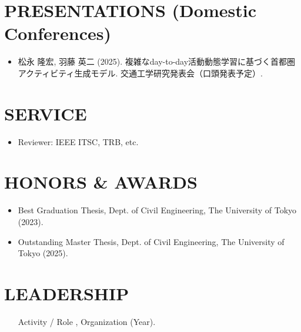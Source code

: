 \documentclass[uplatex,a4paper,10pt]{jsarticle}
\begin{document}
\section*{PRESENTATIONS (Domestic Conferences)}
\begin{itemize}
  \item 松永 隆宏, 羽藤 英二 (2025).
  複雑なday-to-day活動動態学習に基づく首都圏アクティビティ生成モデル.
  交通工学研究発表会（口頭発表予定）.
\end{itemize}

\section*{SERVICE}
\begin{itemize}
  \item Reviewer: IEEE ITSC, TRB, etc.
\end{itemize}

\section*{HONORS \& AWARDS}
\begin{itemize}
  \item Best Graduation Thesis, Dept. of Civil Engineering, The University of Tokyo (2023).
  \item Outstanding Master Thesis, Dept. of Civil Engineering, The University of Tokyo (2025).
\end{itemize}

\section*{LEADERSHIP}
\begin{itemize}
  \item [Activity / Role], Organization (Year).
\end{itemize}
\end{document}
